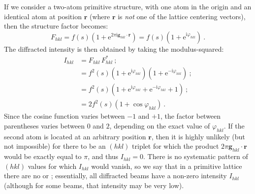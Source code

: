 If we consider a two-atom primitive structure, with one atom in the origin and an identical atom at position $\mathbf{r}$ (where $\mathbf{r}$ is \textit{not} one of the lattice centering vectors), then the structure factor becomes:
\[
	F_{hkl} = f(s) \left( 1+ \mathrm{e}^{2\pi\mathrm{i}\mathbf{g}_{hkl}\cdot\mathbf{r}} \right) = f(s) \left( 1+ \mathrm{e}^{\mathrm{i}\varphi_{hkl}} \right)\ .
\]
The diffracted intensity is then obtained by taking the modulus-squared:
\begin{equation*}
\begin{split}
	I_{hkl} &= F_{hkl}\,F^{\ast}_{hkl}\ ;\\
	&= f^2(s) \left( 1+ \mathrm{e}^{\mathrm{i}\varphi_{hkl}} \right)\left( 1+ \mathrm{e}^{-\mathrm{i}\varphi_{hkl}} \right)\ ;\\
	&= f^2(s) \left( 1 +\mathrm{e}^{\mathrm{i}\varphi_{hkl}}+\mathrm{e}^{-\mathrm{i}\varphi_{hkl}}+1\right)\ ;\\
	&= 2f^2(s) \left(1 + \cos\varphi_{hkl}\right)\ .  
\end{split}
\end{equation*}
Since the cosine function varies between $-1$ and $+1$, the factor between parentheses varies between $0$ and $2$, depending on the exact value of $\varphi_{hkl}$.  If the second atom is located at an arbitrary position $\mathbf{r}$, then it is highly unlikely (but not impossible) for there to be an $(hkl)$ triplet for which the product $2\pi\mathbf{g}_{hkl}\cdot\mathbf{r}$ would be exactly equal to $\pi$, and thus $I_{hkl}=0$.  There is no systematic pattern of $(hkl)$ values for which $I_{hkl}$ would vanish, so we say that in a primitive lattice there are no  or ; essentially, all diffracted beams have a non-zero intensity $I_{hkl}$ (although for some beams, that intensity may be very low).

